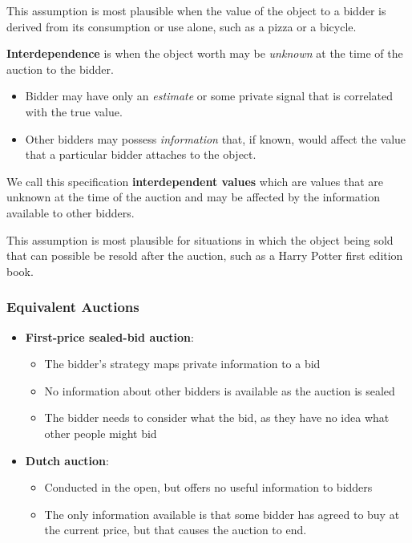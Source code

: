 \documentclass[11pt,a4paper,titlepage,dvipsnames,cmyk]{scrartcl}
\begin{document}
This assumption is most plausible when the value of the object to a bidder is derived from its consumption or use alone, such as a pizza or a bicycle.

\textbf{Interdependence} is when the object worth may be \textit{unknown} at the time of the auction to the bidder.
\begin{itemize}
    \item Bidder may have only an \textit{estimate} or some private signal that is correlated with the true value.
    \item Other bidders may possess \textit{information} that, if known, would affect the value that a particular bidder attaches to the object.
\end{itemize}

We call this specification \textbf{interdependent values} which are values that are unknown at the time of the auction and may be affected by the information available to other bidders.

This assumption is most plausible for situations in which the object being sold that can possible be resold after the auction, such as a Harry Potter first edition book.

\subsubsection{Equivalent Auctions}
\begin{itemize}
    \item \textbf{First-price sealed-bid auction}:
    \begin{itemize}
        \item The bidder's strategy maps private information to a bid
        \item No information about other bidders is available as the auction is sealed
        \item The bidder needs to consider what the bid, as they have no idea what other people might bid
    \end{itemize}
    \item \textbf{Dutch auction}:
    \begin{itemize}
        \item Conducted in the open, but offers no useful information to bidders
        \item The only information available is that some bidder has agreed to buy at the current price, but that causes the auction to end.
    \end{itemize}
\end{itemize}
\end{document}
